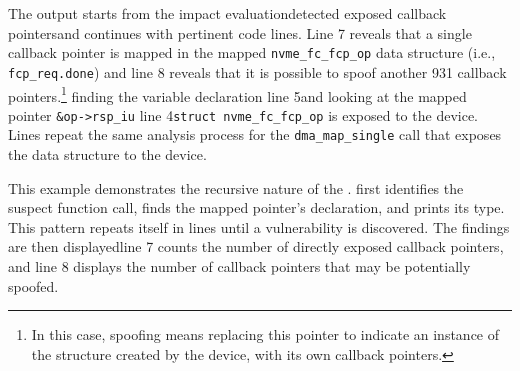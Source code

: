 The output starts from the impact evaluation\DIFdelbegin {}\DIFdelend \DIFaddbegin {}\DIFaddend detected exposed callback pointers\DIFdelbegin \DIFdel{) }\DIFdelend \DIFaddbegin \DIFadd{, }\DIFaddend and continues with pertinent code lines. %
Line 7 reveals \DIFdelbegin {}\DIFdelend that a single callback pointer is mapped in the mapped \texttt{nvme\_fc\_fcp\_op} data structure (i.e., \texttt{fcp\_req.done}) and line 8 reveals that it is possible to spoof another 931 callback pointers.\footnote{In this case, spoofing means replacing this pointer to indicate an instance of the structure created by the device, with its own callback pointers.}
\DIFdelbegin {}%
\DIFdelend \DIFaddbegin {}\DIFaddend finding the variable declaration \DIFdelbegin {}\DIFdelend \DIFaddbegin {}\DIFaddend line 5\DIFdelbegin \DIFdel{) }\DIFdelend \DIFaddbegin \DIFadd{, }\DIFaddend and looking at the mapped pointer \DIFdelbegin {}\DIFdelend \texttt{\&op->rsp\_iu} \DIFdelbegin {}\DIFdelend \DIFaddbegin {}\DIFaddend line 4\DIFdelbegin {}\DIFdelend \DIFaddbegin \DIFadd{, }\tool {}\DIFaddend \texttt{struct nvme\_fc\_fcp\_op} is exposed to the device. Lines \DIFdelbegin {}\DIFdelend \DIFaddbegin {}\DIFaddend repeat the same analysis process for the \texttt{dma\_map\_single} call that exposes the data structure to the device. 

This example demonstrates the recursive nature of the \DIFdelbegin {}\DIFdelend \DIFaddbegin {}\DIFaddend .
\tool first identifies the suspect function call, \DIFdelbegin {}\DIFdelend finds the mapped pointer's declaration, and \DIFdelbegin {}\DIFdelend \DIFaddbegin {}\DIFaddend prints its type. This pattern repeats itself in lines \DIFdelbegin {}\DIFdelend \DIFaddbegin {}\DIFaddend until a vulnerability is discovered. The findings are then displayed\DIFdelbegin \DIFdel{; }\DIFdelend \DIFaddbegin \DIFadd{: }\DIFaddend line 7 counts the number of directly exposed callback pointers, and line 8 displays the number of callback pointers that may be potentially spoofed.



